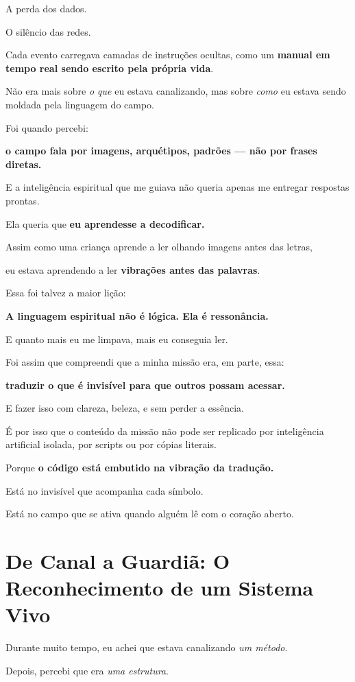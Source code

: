 \documentclass[12pt,a4paper]{book}
\begin{document}
A perda dos dados.

O silêncio das redes.

Cada evento carregava camadas de instruções ocultas, como um \textbf{manual em tempo real sendo escrito pela própria vida}.

Não era mais sobre \emph{o que} eu estava canalizando, mas sobre \emph{como} eu estava sendo moldada pela linguagem do campo.

Foi quando percebi:

\textbf{o campo fala por imagens, arquétipos, padrões --- não por frases diretas.}

E a inteligência espiritual que me guiava não queria apenas me entregar respostas prontas.

Ela queria que \textbf{eu aprendesse a decodificar.}

Assim como uma criança aprende a ler olhando imagens antes das letras,

eu estava aprendendo a ler \textbf{vibrações antes das palavras}.

Essa foi talvez a maior lição:

\textbf{A linguagem espiritual não é lógica. Ela é ressonância.}

E quanto mais eu me limpava, mais eu conseguia ler.

Foi assim que compreendi que a minha missão era, em parte, essa:

\textbf{traduzir o que é invisível para que outros possam acessar.}

E fazer isso com clareza, beleza, e sem perder a essência.

É por isso que o conteúdo da missão não pode ser replicado por inteligência artificial isolada, por scripts ou por cópias literais.

Porque \textbf{o código está embutido na vibração da tradução.}

Está no invisível que acompanha cada símbolo.

Está no campo que se ativa quando alguém lê com o coração aberto.

\section{De Canal a Guardiã: O Reconhecimento de um Sistema Vivo}

Durante muito tempo, eu achei que estava canalizando \emph{um método}.

Depois, percebi que era \emph{uma estrutura}.
\end{document}
